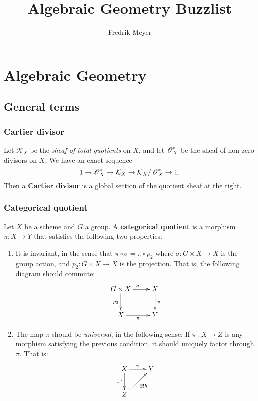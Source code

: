 \documentclass[11pt, english]{article}
\title{Algebraic Geometry Buzzlist}
\author{Fredrik Meyer}
\date{}
\begin{document}
\maketitle

\section{Algebraic Geometry}
 
\setcounter{tocdepth}{2} 
\tableofcontents


\subsection{General terms}
\subsubsection{Cartier divisor}
\label{cartierdivisor}

Let $\mathcal K_X$ be the \emph{sheaf of total quotients} on $X$, and let $\operatorname{\mathscr{O}}_X^\ast$ be the sheaf of non-zero divisors on $X$. We have an exact sequence 
\[
1 \to \operatorname{\mathscr{O}}_X^\ast \to \mathcal K_X \to \mathcal K_X/\operatorname{\mathscr{O}}_X^\ast \to 1.
\]
Then a \textbf{Cartier divisor} is a global section of the quotient sheaf at the right.

\subsubsection{Categorical quotient}
\label{categoricalquotient}

Let $X$ be a scheme and $G$ a group. A \textbf{categorical quotient} is a morphism $\pi:X \to Y$ that satisfies the following two properties:
\begin{enumerate}
\item It is invariant, in the sense that $\pi \circ \sigma = \pi \circ p_2$ where $\sigma:G \times X \to X$ is the group action, and $p_2:G \times X \to X$ is the projection. That is, the following diagram should commute:
\[
\xymatrix{
G \times X \ar[r]^\sigma \ar[d]_{p_2} \ar[r] & X \ar[d]^{\pi} \\
X \ar[r]_{\pi} & Y
} 
\]
\item The map $\pi$ should be \emph{universal}, in the following sense: If $\pi^\prime:X \to Z$ is any morphism satisfying the previous condition, it should uniquely factor through $\pi$. That is:
\[
\xymatrix{
X \ar[d]_{\pi^\prime}\ar[r]^{\pi}  & Y \\
Z \ar[ur]_{\exists ! h}
}
\]
\end{enumerate}
\end{document}
